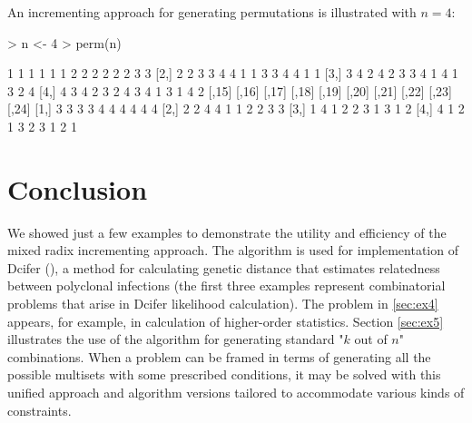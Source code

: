 \documentclass[11pt]{article}
\begin{document}
An incrementing approach for generating permutations is illustrated with $n = 4$:

\begin{Schunk}
\begin{Sinput}
> n <- 4
> perm(n)
\end{Sinput}
\begin{Soutput}
     [,1] [,2] [,3] [,4] [,5] [,6] [,7] [,8] [,9] [,10] [,11] [,12] [,13] [,14]
[1,]    1    1    1    1    1    1    2    2    2     2     2     2     3     3
[2,]    2    2    3    3    4    4    1    1    3     3     4     4     1     1
[3,]    3    4    2    4    2    3    3    4    1     4     1     3     2     4
[4,]    4    3    4    2    3    2    4    3    4     1     3     1     4     2
     [,15] [,16] [,17] [,18] [,19] [,20] [,21] [,22] [,23] [,24]
[1,]     3     3     3     3     4     4     4     4     4     4
[2,]     2     2     4     4     1     1     2     2     3     3
[3,]     1     4     1     2     2     3     1     3     1     2
[4,]     4     1     2     1     3     2     3     1     2     1
\end{Soutput}
\end{Schunk}

\section{Conclusion}

We showed just a few examples to demonstrate the utility and efficiency of the mixed radix incrementing approach. The algorithm is used for implementation of Dcifer (\cite{gerlovina2022dcifer}), a method for calculating genetic distance that estimates relatedness between polyclonal infections (the first three examples represent combinatorial problems that arise in Dcifer likelihood calculation). The problem in \ref{sec:ex4} appears, for example, in calculation of higher-order statistics. Section \ref{sec:ex5} illustrates the use of the algorithm for generating standard "$k$ out of $n$" combinations. When a problem can be framed in terms of generating all the possible multisets with some prescribed conditions, it may be solved with this unified approach and algorithm versions tailored to accommodate various kinds of constraints. 


%

\end{document}
